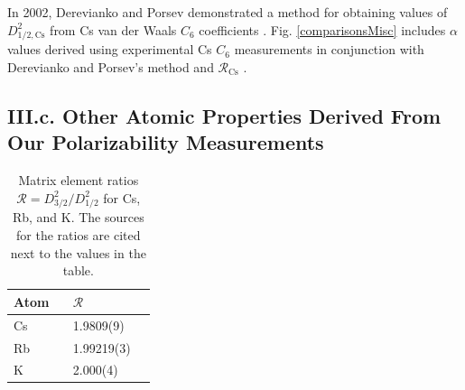 \documentclass[twocolumn,prl,showpacs,superscriptaddress]{revtex4-1}   %
\newcommand{\sspace}{$\enspace$}
\newcommand{\figref}[1]{Fig. \ref{#1}}
\newcommand{\rcs}{\mathcal{R}_{\mathrm{Cs}}}
\begin{document}
In 2002, Derevianko and Porsev demonstrated a method for obtaining values of $D_{1/2,\mathrm{Cs}}^2$ from Cs van der Waals $C_6$ coefficients \cite{Derevianko2001}. \figref{comparisonsMisc} includes $\alpha$ values derived using experimental Cs $C_6$ measurements in conjunction with Derevianko and Porsev's method and $\rcs$ \cite{Leo2000,Chin2004,Derevianko2001,Rafac1998}.

\subsection{III.c. Other Atomic Properties Derived From Our Polarizability Measurements}

\begingroup
\begin{table}
\caption{\label{tableR}Matrix element ratios $\mathcal{R} = D_{3/2}^2/D_{1/2}^2$ for Cs, Rb, and K. The sources for the ratios are cited next to the values in the table.}
\begin{center}
\begin{tabular}{lll}
\hline\hline
Atom \sspace & $\mathcal{R}$ \\
\hline
Cs & 1.9809(9) & \cite{Rafac1998} \\
Rb & 1.99219(3) & \cite{Leonard2015} \\
K  & 2.000(4) & \cite{Holmgren2012} \\
\hline\hline
\end{tabular}
\end{center}
\end{table}
\endgroup
\end{document}
